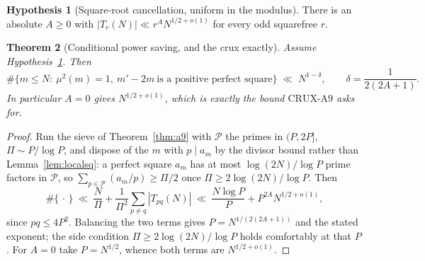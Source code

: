 \documentclass[11pt]{article}
\newtheorem{theorem}{Theorem}[section]
\theoremstyle{definition}
\newtheorem{hypothesis}[theorem]{Hypothesis}
\begin{document}
\begin{hypothesis}[Square-root cancellation, uniform in the modulus]\label{hyp:sq}
There is an absolute $A\ge0$ with $|T_r(N)|\ll r^{A}N^{1/2+o(1)}$ for every odd squarefree $r$.
\end{hypothesis}

\begin{theorem}[Conditional power saving, and the crux exactly]\label{thm:condpower}
Assume Hypothesis~\textup{\ref{hyp:sq}}. Then
\[ \#\{m\le N:\ \mu^2(m)=1,\ m'-2m\ \text{is a positive perfect square}\}\;\ll\;N^{1-\delta},
   \qquad \delta=\frac1{2(2A+1)}. \]
In particular $A=0$ gives $N^{1/2+o(1)}$, which is exactly the bound
$\mathrm{CRUX}\text{-}\mathrm{A}9$ asks for.
\end{theorem}
\begin{proof}
Run the sieve of Theorem~\ref{thm:a9} with $\mathcal{P}$ the primes in $(P,2P]$, $\Pi\sim P/\log P$,
and dispose of the $m$ with $p\mid a_m$ by the divisor bound rather than
Lemma~\ref{lem:localsq}: a perfect square $a_m$ has at most $\log(2N)/\log P$ prime factors in
$\mathcal{P}$, so $\sum_{p\in\mathcal{P}}(a_m/p)\ge\Pi/2$ once $\Pi\ge2\log(2N)/\log P$. Then
\[ \#\{\,\cdot\,\}\ \ll\ \frac{N}{\Pi}+\frac1{\Pi^2}\sum_{p\neq q}|T_{pq}(N)|
   \ \ll\ \frac{N\log P}{P}+P^{2A}N^{1/2+o(1)}, \]
since $pq\le4P^2$. Balancing the two terms gives $P=N^{1/(2(2A+1))}$ and the stated exponent; the
side condition $\Pi\ge2\log(2N)/\log P$ holds comfortably at that $P$. For $A=0$ take
$P=N^{1/2}$, whence both terms are $N^{1/2+o(1)}$.
\end{proof}
\end{document}
